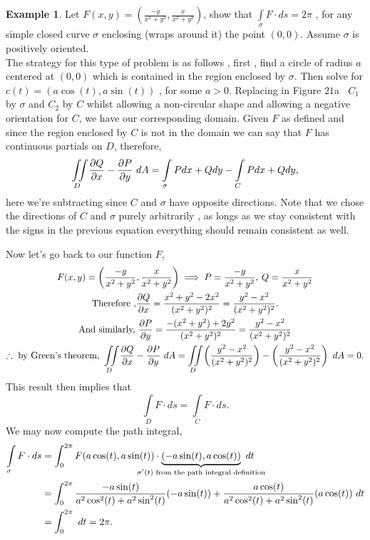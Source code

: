 \documentclass[
	12pt,
	]{article}
\theoremstyle{custom}
\theoremstyle{custom}
\theoremstyle{custom}
\theoremstyle{custom}
\theoremstyle{custom}
\theoremstyle{definition}
\newtheorem{example}{Example}[section]
\theoremstyle{example}
\theoremstyle{note}
\theoremstyle{remark}
\theoremstyle{example}
\newcounter{theo}[section]\setcounter{theo}{0}
\numberwithin{equation}{subsection}
\begin{document}
  				\begin{example}
  					Let $F(x,y) = \left(\frac{-y}{x^{2}+y^{2}} , \frac{x}{x^{2}+y^{2}}\right)$, show that $\int\limits_{\sigma} F\cdot ds = 2\pi$ , for any simple closed curve $\sigma$ enclosing (wraps around it) the point $(0,0)$. Assume $\sigma$ is positively oriented.\\
  					
  					\noindent The strategy for this type of problem is as follows , first , find a circle of radius $a$ centered at $(0,0)$ which is contained in the region enclosed by $\sigma$. Then solve for $c(t) = (a\cos(t) , a\sin(t))$ , for some $a > 0$. Replacing in Figure $21$a $ \ $ $C_{1}$ by $\sigma$ and $C_{2}$ by $C$ whilst allowing a non-circular shape and allowing a negative orientation for $C$, we have our corresponding domain. Given $F$ as defined and since the region enclosed by $C$ is not in the domain we can say that $F$ has continuous partials on $D$, therefore, 
  					$$ \iint\limits_{D} \pdv{Q}{x} - \pdv{P}{y} \ dA = \int\limits_{\sigma} Pdx + Qdy - \int\limits_{C} Pdx + Qdy, $$
  					here we're subtracting since $C$ and $\sigma$ have opposite directions. Note that we chose the directions of $C$ and $\sigma$ purely arbitrarily , as longs as we stay consistent with the signs in the previous equation everything should remain consistent as well.
  					
  					Now let's go back to our function $F$, 
  					\begin{gather*}
  						F(x,y) = \left(\frac{-y}{x^{2}+y^{2}} , \frac{x}{x^{2}+y^{2}}\right)\implies P = \frac{-y}{x^{2}+y^{2}} , \: Q = \frac{x}{x^{2} + y^{2}} \\
  						\text{Therefore ,} \pdv{Q}{x} = \frac{x^{2} + y^{2} -2x^{2}}{(x^{2}+y^{2})^{2}} = \frac{y^{2}-x^{2}}{(x^{2} + y^{2})^{2}}. \\
  						\text{And similarly, } \pdv{P}{y} = \frac{-(x^{2}+y^{2})+2y^{2}}{(x^{2}+y^{2})^{2}} = \frac{y^{2}-x^{2}}{(x^{2}+y^{2})^{2}} \\
  						\therefore \ \text{by Green's theorem, } \iint\limits_{D} \pdv{Q}{x} - \pdv{P}{y} \ dA = \iint\limits_{D}\left(\frac{y^{2}-x^{2}}{(x^{2}+y^{2})^{2}}\right) -\left(\frac{y^{2}-x^{2}}{(x^{2}+y^{2})^{2}}\right) \ dA = 0.
  					\end{gather*}
  					This result then implies that 
  					$$ \int\limits_{D} F \cdot ds = \int\limits_{C} F \cdot ds.$$
  					We may now compute the path integral, 
  					\begin{align*}
  						\int\limits_{\sigma} F \cdot ds &= \int_{0}^{2\pi} F(a\cos(t) , a\sin(t))\cdot \underbrace{(-a\sin(t), a\cos(t))}_{\mathclap{\text{$\sigma'(t)$ from the path integral definition}}} \ dt \\
  						&= \int_{0}^{2\pi} \frac{-a\sin(t)}{a^{2}\cos^{2}(t) + a^{2}\sin^{2}(t)}(-a\sin(t)) + \frac{a\cos(t)}{a^{2}\cos^{2}(t) + a^{2}\sin^{2}(t)}(a\cos(t)) \ dt \\&= \int_{0}^{2\pi} \ dt = 2\pi.
  					\end{align*}
  				\end{example}
  				
\end{document}
